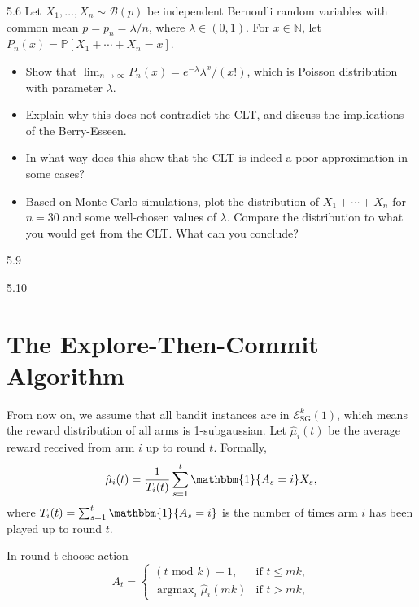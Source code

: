 \documentclass[10pt]{article}
\theoremstyle{definition}
\newenvironment{exercise*}[1]{%
  \IfBlankTF{#1}
    {\renewcommand{\themanualexerciseinner}{\unskip}}
    {\renewcommand\themanualexerciseinner{#1}}%
  \manualexerciseinner
}{\endmanualexerciseinner}
\DeclareMathOperator*{\argmax}{argmax}
\begin{document}
\begin{exercise*}{5.6}
    Let $X_1, \ldots, X_n \sim \mathcal{B}(p)$ be independent Bernoulli random variables with common mean $p = p_n = \lambda /n$, where $\lambda \in (0,1)$.
    For $x \in \mathbb{N}$, let $P_n(x) = \mathbb{P}[X_1 + \cdots + X_n = x]$.
    \begin{itemize}
        \item[(a)] Show that $\lim_{n \to \infty} P_n(x) = e^{-\lambda} \lambda^x / (x!)$, which is Poisson distribution with parameter $\lambda$.
        \item[(b)] Explain why this does not contradict the CLT, and discuss the implications of the Berry-Esseen.
        \item[(c)] In what way does this show that the CLT is indeed a poor approximation in some cases?
        \item[(d)] Based on Monte Carlo simulations, plot the distribution of $X_1 + \cdots + X_n$ for $n=30$ and some well-chosen values of $\lambda$.
        Compare the distribution to what you would get from the CLT. What can you conclude?
    \end{itemize}
\end{exercise*}

\begin{exercise*}{5.9}

\end{exercise*}

\begin{exercise*}{5.10}

\end{exercise*}

\section{The Explore-Then-Commit Algorithm}

From now on, we assume that all bandit instances are in $\mathcal{E}_{\text{SG}}^k(1)$, which means the reward distribution of all arms is 1-subgaussian.
Let $\hat{\mu}_i(t)$ be the average reward received from arm $i$ up to round $t$.
Formally,
\begin{equation*}
    \hat{\mu}_i (t) = \frac{1}{T_i (t)} \sum_{s=1}^{t} \mathbbm{1}\{A_s = i \} X_s,
\end{equation*}
where $T_i(t) = \sum_{s=1}^{t} \mathbbm{1}\{A_s = i\}$ is the number of times arm $i$ has been played up to round $t$.

\begin{algorithm}[H]
    \caption{ETC Algorithm}


    In round t choose action
    \begin{equation*}
        A_t = 
        \begin{cases}
            (t \text{ mod } k) + 1, & \text{if } t \leq mk, \\
            \argmax_i \hat{\mu}_i(mk) & \text{if } t > mk,
        \end{cases}
    \end{equation*}
\end{algorithm}
\end{document}
